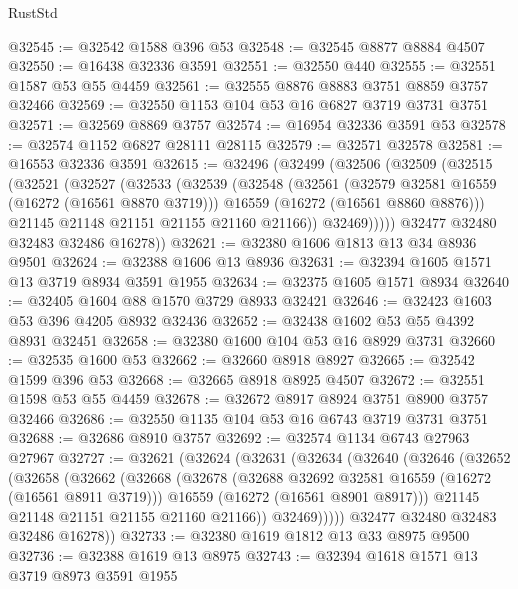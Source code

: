 \begin{lexlean}{RustStd}
\begin{coremodule}
@32545 := @32542 @1588 @396 @53
@32548 := @32545 @8877 @8884 @4507
@32550 := @16438 @32336 @3591
@32551 := @32550 @440
@32555 := @32551 @1587 @53 @55 @4459
@32561 := @32555 @8876 @8883 @3751 @8859 @3757 @32466
@32569 := @32550 @1153 @104 @53 @16 @6827 @3719 @3731 @3751
@32571 := @32569 @8869 @3757
@32574 := @16954 @32336 @3591 @53
@32578 := @32574 @1152 @6827 @28111 @28115
@32579 := @32571 @32578
@32581 := @16553 @32336 @3591
@32615 := @32496
    (@32499
      (@32506
        (@32509
          (@32515
            (@32521
              (@32527
                (@32533
                  (@32539
                    (@32548
                      (@32561
                        (@32579 @32581 @16559 (@16272 (@16561 @8870 @3719)))
                        @16559
                        (@16272 (@16561 @8860 @8876)))
                      @21145
                      @21148
                      @21151
                      @21155
                      @21160
                      @21166))
                  @32469)))))
        @32477
        @32480
        @32483
        @32486
        @16278))
@32621 := @32380 @1606 @1813 @13 @34 @8936 @9501
@32624 := @32388 @1606 @13 @8936
@32631 := @32394 @1605 @1571 @13 @3719 @8934 @3591 @1955
@32634 := @32375 @1605 @1571 @8934
@32640 := @32405 @1604 @88 @1570 @3729 @8933 @32421
@32646 := @32423 @1603 @53 @396 @4205 @8932 @32436
@32652 := @32438 @1602 @53 @55 @4392 @8931 @32451
@32658 := @32380 @1600 @104 @53 @16 @8929 @3731
@32660 := @32535 @1600 @53
@32662 := @32660 @8918 @8927
@32665 := @32542 @1599 @396 @53
@32668 := @32665 @8918 @8925 @4507
@32672 := @32551 @1598 @53 @55 @4459
@32678 := @32672 @8917 @8924 @3751 @8900 @3757 @32466
@32686 := @32550 @1135 @104 @53 @16 @6743 @3719 @3731 @3751
@32688 := @32686 @8910 @3757
@32692 := @32574 @1134 @6743 @27963 @27967
@32727 := @32621
    (@32624
      (@32631
        (@32634
          (@32640
            (@32646
              (@32652
                (@32658
                  (@32662
                    (@32668
                      (@32678
                        (@32688 @32692 @32581 @16559 (@16272 (@16561 @8911 @3719)))
                        @16559
                        (@16272 (@16561 @8901 @8917)))
                      @21145
                      @21148
                      @21151
                      @21155
                      @21160
                      @21166))
                  @32469)))))
        @32477
        @32480
        @32483
        @32486
        @16278))
@32733 := @32380 @1619 @1812 @13 @33 @8975 @9500
@32736 := @32388 @1619 @13 @8975
@32743 := @32394 @1618 @1571 @13 @3719 @8973 @3591 @1955

\end{coremodule}
\end{lexlean}
